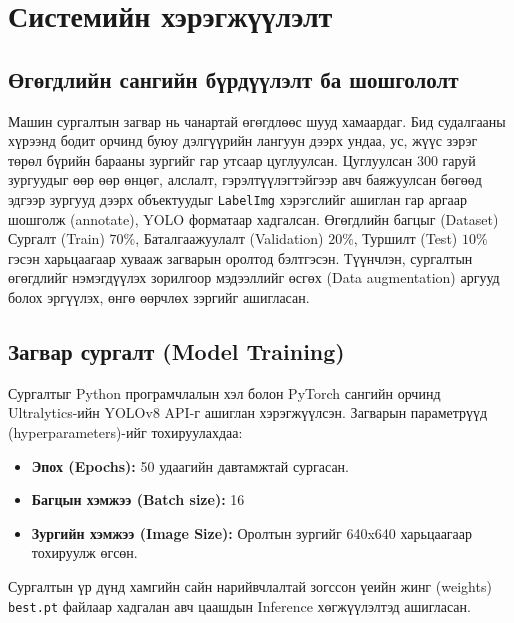 \chapter{Системийн хэрэгжүүлэлт}

\section{Өгөгдлийн сангийн бүрдүүлэлт ба шошгололт}
Машин сургалтын загвар нь чанартай өгөгдлөөс шууд хамаардаг. Бид судалгааны хүрээнд бодит орчинд буюу дэлгүүрийн лангуун дээрх ундаа, ус, жүүс зэрэг төрөл бүрийн барааны зургийг гар утсаар цуглуулсан. Цуглуулсан $300$ гаруй зургуудыг өөр өөр өнцөг, алслалт, гэрэлтүүлэгтэйгээр авч баяжуулсан бөгөөд эдгээр зургууд дээрх объектуудыг \texttt{LabelImg} хэрэгслийг ашиглан гар аргаар шошголж (annotate), YOLO форматаар хадгалсан. Өгөгдлийн багцыг (Dataset) Сургалт (Train) $70\%$, Баталгаажуулалт (Validation) $20\%$, Туршилт (Test) $10\%$ гэсэн харьцаагаар хувааж загварын оролтод бэлтгэсэн. Түүнчлэн, сургалтын өгөгдлийг нэмэгдүүлэх зорилгоор мэдээллийг өсгөх (Data augmentation) аргууд болох эргүүлэх, өнгө өөрчлөх зэргийг ашигласан.

\section{Загвар сургалт (Model Training)}
Сургалтыг Python програмчлалын хэл болон PyTorch сангийн орчинд Ultralytics-ийн YOLOv8 API-г ашиглан хэрэгжүүлсэн. Загварын параметрүүд (hyperparameters)-ийг тохируулахдаа:
\begin{itemize}
    \item \textbf{Эпох (Epochs):} 50 удаагийн давтамжтай сургасан.
    \item \textbf{Багцын хэмжээ (Batch size):} 16
    \item \textbf{Зургийн хэмжээ (Image Size):} Оролтын зургийг 640x640 харьцаагаар тохируулж өгсөн.
\end{itemize}
Сургалтын үр дүнд хамгийн сайн нарийвчлалтай зогссон үеийн жинг (weights) \texttt{best.pt} файлаар хадгалан авч цаашдын Inference хөгжүүлэлтэд ашигласан.

